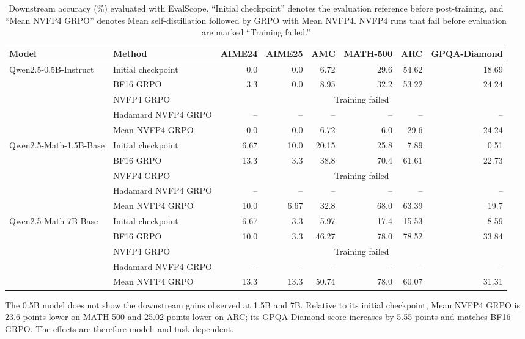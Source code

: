 \documentclass[letterpaper]{article}
\begin{document}
\begin{table}[!t]
\centering
\footnotesize
\caption{Downstream accuracy (\%) evaluated with EvalScope. ``Initial checkpoint'' denotes the evaluation reference before post-training, and ``Mean NVFP4 GRPO'' denotes Mean self-distillation followed by GRPO with Mean NVFP4. NVFP4 runs that fail before evaluation are marked ``Training failed.''}
\label{tab:main}
\begin{tabular}{llrrrrrr}
\toprule
Model & Method & AIME24 & AIME25 & AMC & MATH-500 & ARC & GPQA-Diamond \\
\midrule
Qwen2.5-0.5B-Instruct & Initial checkpoint & 0.0 & 0.0 & 6.72 & 29.6 & 54.62 & 18.69 \\
& BF16 GRPO & 3.3 & 0.0 & 8.95 & 32.2 & 53.22 & 24.24 \\
& NVFP4 GRPO & \multicolumn{6}{c}{Training failed} \\
& Hadamard NVFP4 GRPO & -- & -- & -- & -- & -- & -- \\
& Mean NVFP4 GRPO & 0.0 & 0.0 & 6.72 & 6.0 & 29.6 & 24.24 \\
\midrule
Qwen2.5-Math-1.5B-Base & Initial checkpoint & 6.67 & 10.0 & 20.15 & 25.8 & 7.89 & 0.51 \\
& BF16 GRPO & 13.3 & 3.3 & 38.8 & 70.4 & 61.61 & 22.73 \\
& NVFP4 GRPO & \multicolumn{6}{c}{Training failed} \\
& Hadamard NVFP4 GRPO & -- & -- & -- & -- & -- & -- \\
& Mean NVFP4 GRPO & 10.0 & 6.67 & 32.8 & 68.0 & 63.39 & 19.7 \\
\midrule
Qwen2.5-Math-7B-Base & Initial checkpoint & 6.67 & 3.3 & 5.97 & 17.4 & 15.53 & 8.59 \\
& BF16 GRPO & 10.0 & 3.3 & 46.27 & 78.0 & 78.52 & 33.84 \\
& NVFP4 GRPO & \multicolumn{6}{c}{Training failed} \\
& Hadamard NVFP4 GRPO & -- & -- & -- & -- & -- & -- \\
& Mean NVFP4 GRPO & 13.3 & 13.3 & 50.74 & 78.0 & 60.07 & 31.31 \\
\bottomrule
\end{tabular}
\end{table}

\FloatBarrier

The 0.5B model does not show the downstream gains observed at 1.5B and 7B. Relative to its initial checkpoint, Mean NVFP4 GRPO is 23.6 points lower on MATH-500 and 25.02 points lower on ARC; its GPQA-Diamond score increases by 5.55 points and matches BF16 GRPO. The effects are therefore model- and task-dependent.
\end{document}
